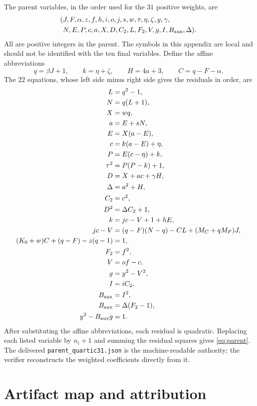 \documentclass[11pt,letterpaper]{article}
\theoremstyle{remark}
\begin{document}
The parent variables, in the order used for the \(31\) positive weights,
are
\[
\begin{split}
(&J,F,\alpha,z,f,h,i,o,j,s,w,\tau,\eta,\zeta,y,\gamma,\\
 &N,E,P,c,a,X,D,C_2,L,F_2,V,g,I,B_{\rm aux},\Delta).
\end{split}
\]
All are positive integers in the parent. The symbols in this appendix
are local and should not be identified with the ten final variables.
Define the affine abbreviations
\[
q=\beta J+1,\qquad k=\eta+\zeta,\qquad
H=4a+3,\qquad C=q-F-\alpha.
\]
The \(22\) equations, whose left side minus right side gives the
residuals in order, are
\begin{align*}
L&=q^2-1,\\
N&=q(L+1),\\
X&=wq,\\
a&=E+sN,\\
E&=X(a-E),\\
c&=k(a-E)+\eta,\\
P&=E(c-\eta)+k,\\
\tau^2&=P(P-k)+1,\\
D&=X+ac+\gamma H,\\
\Delta&=a^2+H,\\
C_2&=c^2,\\
D^2&=\Delta C_2+1,\\
k&=jc-V+1+hE,\\
jc-V&=(q-F)(N-q)-CL+(M_C+qM_F)J,\\
(K_0+w)C+(q-F)-z(q-1)&=1,\\
F_2&=f^2,\\
V&=of-c,\\
g&=y^2-V^2,\\
I&=iC_2,\\
B_{\rm aux}&=I^2,\\
B_{\rm aux}&=\Delta(F_2-1),\\
y^2-B_{\rm aux}g&=1.
\end{align*}
After substituting the affine abbreviations, each residual is
quadratic. Replacing each listed variable by \(n_i+1\) and summing
the residual squares gives \eqref{eq:parent}. The delivered
\texttt{parent\_quartic31.json} is the machine-readable authority;
the verifier reconstructs the weighted coefficients directly from it.

\section{Artifact map and attribution}
\end{document}
